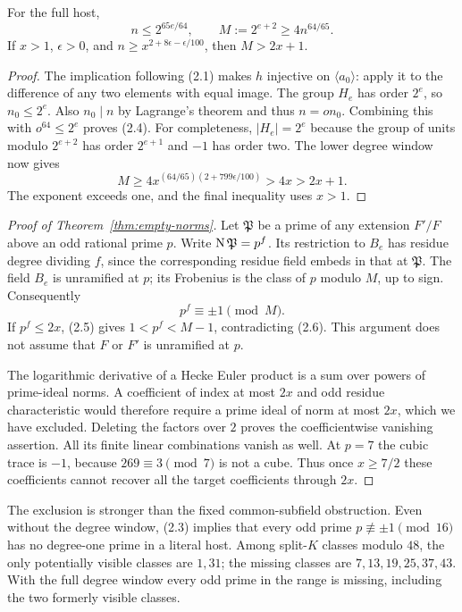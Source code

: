 \begin{lemma}
\label{lem:large-tower}
For the full host,
\[
 n\le2^{65e/64},\qquad
 M:=2^{e+2}\ge4n^{64/65}.
                                                        \tag{2.4}
\]
If $x>1$, $\epsilon>0$, and
$n\ge x^{2+8\epsilon-\epsilon/100}$, then $M>2x+1$.
\end{lemma}
\begin{proof}
The implication following (2.1) makes $h$ injective on
$\langle a_0\rangle$: apply it to the difference of any two
elements with equal image. The group $H_e$ has order $2^e$, so
$n_0\le2^e$. Also $n_0\mid n$ by Lagrange's theorem and thus
$n=o n_0$. Combining this with $o^{64}\le2^e$ proves (2.4).
For completeness, $|H_e|=2^e$ because the group of units modulo
$2^{e+2}$ has order $2^{e+1}$ and $-1$ has order two.
The lower degree window now gives
\[
 M\ge4x^{(64/65)(2+799\epsilon/100)}>4x>2x+1.
                                                        \tag{2.5}
\]
The exponent exceeds one, and the final inequality uses $x>1$.
\end{proof}

\begin{proof}[Proof of Theorem~\ref{thm:empty-norms}]
Let $\mathfrak P$ be a prime of any extension $F'/F$ above an odd
rational prime $p$. Write $\operatorname N\mathfrak P=p^f$. Its restriction
to $B_e$ has residue degree dividing $f$, since the corresponding
residue field embeds in that at $\mathfrak P$. The field $B_e$
is unramified at $p$; its Frobenius is the class of $p$ modulo
$M$, up to sign. Consequently
\[
                         p^f\equiv\pm1\pmod M.
                                                        \tag{2.6}
\]
If $p^f\le2x$, (2.5) gives $1<p^f<M-1$, contradicting (2.6).
This argument does not assume that $F$ or $F'$ is unramified at $p$.

The logarithmic derivative of a Hecke Euler product is a sum over
powers of prime-ideal norms. A coefficient of index at most $2x$
and odd residue characteristic would therefore require a prime
ideal of norm at most $2x$, which we have excluded. Deleting the
factors over $2$ proves the coefficientwise vanishing assertion.
All its finite linear combinations vanish as well. At $p=7$ the
cubic trace is $-1$, because $269\equiv3\pmod7$ is not a cube.
Thus once $x\ge7/2$ these coefficients cannot recover all the
target coefficients through $2x$.
\end{proof}

The exclusion is stronger than the fixed common-subfield obstruction.
Even without the degree window, (2.3) implies that every odd prime
$p\not\equiv\pm1\pmod{16}$ has no degree-one prime in a literal
host. Among split-$K$ classes modulo $48$, the only potentially
visible classes are $1,31$; the missing classes are
$7,13,19,25,37,43$. With the full degree window every odd prime
in the range is missing, including the two formerly visible classes.

